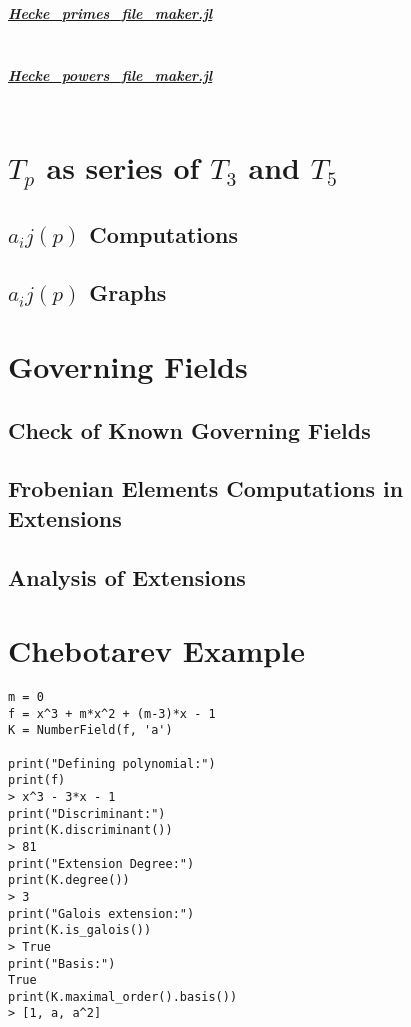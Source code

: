 \subparagraph{\href{https://github.com/pauldubois98/ModularFormsModuloTwo.jl/blob/master/src/data/Hecke_primes_file_maker.jl}{Hecke\_primes\_file\_maker.jl}}
\label{code:HeckePrimesFileMaker}
\inputminted[breaklines]{julia}{Module/HeckePrimesFileMaker.jl}

\subparagraph{\href{https://github.com/pauldubois98/ModularFormsModuloTwo.jl/blob/master/src/data/Hecke_powers_file_maker.jl}{Hecke\_powers\_file\_maker.jl}}
\label{code:HeckePowersFileMaker}
\inputminted[breaklines]{julia}{Module/HeckePowersFileMaker.jl}


\section{$T_p$ as series of $T_3$ and $T_5$}
\subsection{$a_ij(p)$ Computations}
\subsection{$a_ij(p)$ Graphs}

\section{Governing Fields}
\subsection{Check of Known Governing Fields}
\subsection{Frobenian Elements Computations in Extensions}
\subsection{Analysis of Extensions}



\section{Chebotarev Example}
\label{code:ChebotarevExample}
\begin{verbatim}
m = 0
f = x^3 + m*x^2 + (m-3)*x - 1
K = NumberField(f, 'a')

print("Defining polynomial:")
print(f)
> x^3 - 3*x - 1
print("Discriminant:")
print(K.discriminant())
> 81
print("Extension Degree:")
print(K.degree())
> 3
print("Galois extension:")
print(K.is_galois())
> True
print("Basis:")
True
print(K.maximal_order().basis())
> [1, a, a^2]
\end{verbatim}
